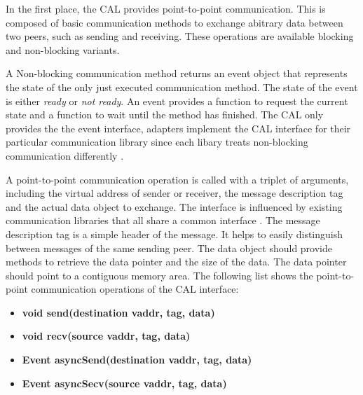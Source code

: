 In the first place, the CAL provides point-to-point communication. This is composed of
basic communication methods to exchange abitrary data between two
peers, such as sending and receiving.  These operations are available
blocking and non-blocking variants.

A Non-blocking communication method returns an event object that represents
the state of the only just executed communication method. The state
of the event is either \emph{ready} or \emph{not ready}. An
event provides a function to request the current state and a function
to  wait until the method has finished. The CAL only provides the
the event interface, adapters implement the CAL interface for their
particular communication library since each libary treats non-blocking
communication differently \cite{ref:mpi_specification,ref:boost_asio}.

A point-to-point communication operation is called with a triplet of
arguments, including the virtual address of sender or receiver, the
message description tag and the actual data object to exchange.  The
interface is influenced by existing communication libraries that all
share a common interface \cite{ref:boost_mpi, ref:boost_asio,
  ref:zmq}. The message description tag is a simple header of the
message. It helps to easily distinguish between messages of the same
sending peer.  The data object should provide methods to retrieve the
data pointer and the size of the data. The data pointer should point
to a contiguous memory area. The following list shows the
point-to-point communication operations of the CAL interface:

\begin{itemize}
  \item  \textbf{void send(destination vaddr, tag, data)}
  \item  \textbf{void recv(source vaddr, tag, data)}
  \item  \textbf{Event asyncSend(destination vaddr, tag, data)}
  \item  \textbf{Event asyncSecv(source vaddr, tag, data)}
\end{itemize}

